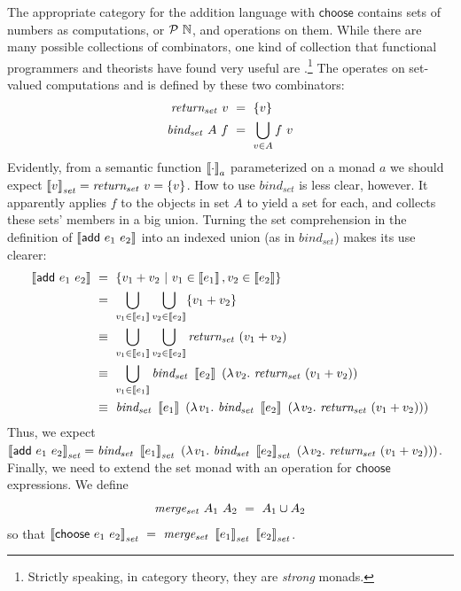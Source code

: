 The appropriate category for the addition language with $\mathsf{choose}$ contains sets of numbers as computations, or $\mathcal{P}~\mathbb{N}$, and operations on them.
While there are many possible collections of combinators, one kind of collection that functional programmers and theorists have found very useful are .\footnote{Strictly speaking, in category theory, they are \emph{strong} monads.}
The  operates on set-valued computations and is defined by these two combinators:
\begin{equation}
\begin{aligned}
	\mathit{return_{set}}~v&\ =\ \{{v}\} \\
	\mathit{bind_{set}}~A~f&\ =\ \bigcup_{v \in A} f~v
\end{aligned}
\end{equation}
Evidently, from a semantic function $\left\llbracket{\cdot}\right\rrbracket_a$ parameterized on a monad $a$ we should expect $\left\llbracket{v}\right\rrbracket_\mathit{set} = \mathit{return_{set}}~v = \{{v}\}$.
How to use $\mathit{bind_{set}}$ is less clear, however.
It apparently applies $f$ to the objects in set $A$ to yield a set for each, and collects these sets' members in a big union.
Turning the set comprehension in the definition of $\left\llbracket{\mathsf{add}~e_1~e_2}\right\rrbracket$ into an indexed union (as in $\mathit{bind_{set}}$) makes its use clearer:
\begin{equation}
\begin{aligned}
	\left\llbracket{\mathsf{add}~e_1~e_2}\right\rrbracket
	&\ =\ \lbrace {v_1 + v_2} \ \lvert\ {v_1 \in \left\llbracket{e_1}\right\rrbracket, v_2 \in \left\llbracket{e_2}\right\rrbracket} \rbrace
\\
	&\ =\ \bigcup_{v_1 \in \left\llbracket{e_1}\right\rrbracket} \bigcup_{v_2 \in \left\llbracket{e_2}\right\rrbracket} \{{v_1 + v_2}\}
\\
	&\ \equiv\ \bigcup_{v_1 \in \left\llbracket{e_1}\right\rrbracket} \bigcup_{v_2 \in \left\llbracket{e_2}\right\rrbracket} \mathit{return_{set}}~(v_1 + v_2)
\\
	&\ \equiv\ \bigcup_{v_1 \in \left\llbracket{e_1}\right\rrbracket} \mathit{bind_{set}}~\left\llbracket{e_2}\right\rrbracket~(\lambda\mspace{2mu}{v_2}\ldotp\, \mathit{return_{set}}~(v_1 + v_2))
\\
	&\ \equiv\ \mathit{bind_{set}}~\left\llbracket{e_1}\right\rrbracket~(\lambda\mspace{2mu}{v_1}\ldotp\, \mathit{bind_{set}}~\left\llbracket{e_2}\right\rrbracket~(\lambda\mspace{2mu}{v_2}\ldotp\, \mathit{return_{set}}~(v_1 + v_2)))
\end{aligned}
\end{equation}
Thus, we expect $\left\llbracket{\mathsf{add}~e_1~e_2}\right\rrbracket_\mathit{set} = \mathit{bind_{set}}~\left\llbracket{e_1}\right\rrbracket_\mathit{set}~(\lambda\mspace{2mu}{v_1}\ldotp\, \mathit{bind_{set}}~\left\llbracket{e_2}\right\rrbracket_\mathit{set}~(\lambda\mspace{2mu}{v_2}\ldotp\, \mathit{return_{set}}~(v_1 + v_2)))$.
Finally, we need to extend the set monad with an operation for $\mathsf{choose}$ expressions.
We define
\begin{equation}
	\mathit{merge_{set}}~A_1~A_2\ =\ A_1 \cup A_2
\end{equation}
so that $\meaningof{\mathsf{choose}~e_1~e_2}_\mathit{set}\ =\ \mathit{merge_{set}}~\meaningof{e_1}_\mathit{set}~\meaningof{e_2}_\mathit{set}$.

